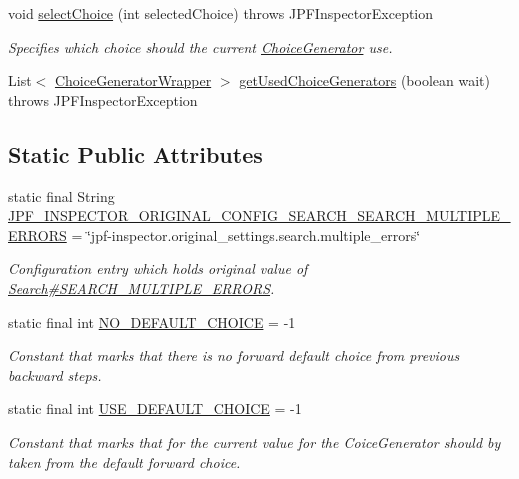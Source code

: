 \begin{DoxyCompactItemize}
void \hyperlink{interfacegov_1_1nasa_1_1jpf_1_1inspector_1_1interfaces_1_1_choice_generators_interface_a055b8d48f863633614dee147bc607ed7}{select\+Choice} (int selected\+Choice)  throws J\+P\+F\+Inspector\+Exception
\begin{DoxyCompactList}\small\item\em Specifies which choice should the current \hyperlink{}{Choice\+Generator} use. \end{DoxyCompactList}\item 
List$<$ \hyperlink{classgov_1_1nasa_1_1jpf_1_1inspector_1_1utils_1_1_choice_generator_wrapper}{Choice\+Generator\+Wrapper} $>$ \hyperlink{interfacegov_1_1nasa_1_1jpf_1_1inspector_1_1interfaces_1_1_choice_generators_interface_aba03345fdef7f19fdebe45ff7f873297}{get\+Used\+Choice\+Generators} (boolean wait)  throws J\+P\+F\+Inspector\+Exception
\end{DoxyCompactItemize}
\subsection*{Static Public Attributes}
\begin{DoxyCompactItemize}
\item 
static final String \hyperlink{classgov_1_1nasa_1_1jpf_1_1inspector_1_1server_1_1jpf_1_1_j_p_f_inspector_a8af1cac155ad7ceb65c509f627741f3f}{J\+P\+F\+\_\+\+I\+N\+S\+P\+E\+C\+T\+O\+R\+\_\+\+O\+R\+I\+G\+I\+N\+A\+L\+\_\+\+C\+O\+N\+F\+I\+G\+\_\+\+S\+E\+A\+R\+C\+H\+\_\+\+S\+E\+A\+R\+C\+H\+\_\+\+M\+U\+L\+T\+I\+P\+L\+E\+\_\+\+E\+R\+R\+O\+RS} = \char`\"{}jpf-\/inspector.\+original\+\_\+settings.\+search.\+multiple\+\_\+errors\char`\"{}
\begin{DoxyCompactList}\small\item\em Configuration entry which holds original value of \hyperlink{}{Search\#\+S\+E\+A\+R\+C\+H\+\_\+\+M\+U\+L\+T\+I\+P\+L\+E\+\_\+\+E\+R\+R\+O\+RS}. \end{DoxyCompactList}\item 
static final int \hyperlink{interfacegov_1_1nasa_1_1jpf_1_1inspector_1_1interfaces_1_1_choice_generators_interface_a96ec402a57d2b3547337e677e23075cd}{N\+O\+\_\+\+D\+E\+F\+A\+U\+L\+T\+\_\+\+C\+H\+O\+I\+CE} = -\/1
\begin{DoxyCompactList}\small\item\em Constant that marks that there is no forward default choice from previous backward steps. \end{DoxyCompactList}\item 
static final int \hyperlink{interfacegov_1_1nasa_1_1jpf_1_1inspector_1_1interfaces_1_1_choice_generators_interface_ac57a2bb0eb101be2c2b27bd19cb81ea7}{U\+S\+E\+\_\+\+D\+E\+F\+A\+U\+L\+T\+\_\+\+C\+H\+O\+I\+CE} = -\/1
\begin{DoxyCompactList}\small\item\em Constant that marks that for the current value for the Coice\+Generator should by taken from the default forward choice. \end{DoxyCompactList}\end{DoxyCompactItemize}
